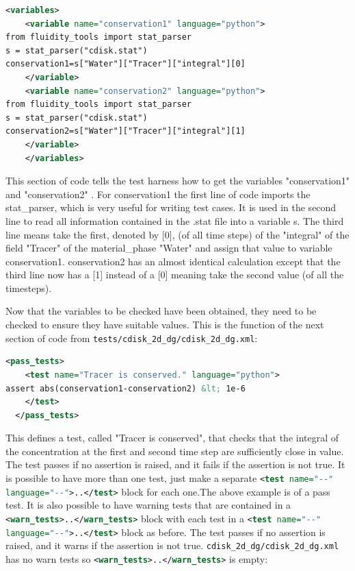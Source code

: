 \begin{example}
\begin{lstlisting}[language=xml] 
  <variables>
    <variable name="conservation1" language="python">
from fluidity_tools import stat_parser
s = stat_parser("cdisk.stat")
conservation1=s["Water"]["Tracer"]["integral"][0]
    </variable>
    <variable name="conservation2" language="python">
from fluidity_tools import stat_parser
s = stat_parser("cdisk.stat")
conservation2=s["Water"]["Tracer"]["integral"][1]
    </variable>
    </variables>
\end{lstlisting}
\end{example}

This section of code tells the test harness how to get the variables "conservation1"  and "conservation2" . For conservation1 the first line of code imports the stat\_parser, which is very useful for writing test cases. It is used in the second line to read all information contained in the .stat file into a variable s. The third line means take the first, denoted by [0], (of all time steps) of the "integral" of the field "Tracer" of the material\_phase "Water" and assign that value to variable conservation1. conservation2 has an almost identical calculation except that the third line now has a [1] instead of a [0] meaning take the second value (of all the timesteps).

Now that the variables to be checked have been obtained, they need to be checked to ensure they have suitable values. This is the function of the next section of code from \lstinline[language=bash]+tests/cdisk_2d_dg/cdisk_2d_dg.xml+:

\begin{example}
\begin{lstlisting}[language=xml] 
    <pass_tests>
    <test name="Tracer is conserved." language="python">
assert abs(conservation1-conservation2) &lt; 1e-6
    </test>
  </pass_tests>
\end{lstlisting}
\end{example}

This defines a test, called "Tracer is conserved", that checks that the integral of the concentration at the first and second time step are sufficiently close in value. The test passes if no assertion is raised, and it fails if the assertion is not true. It is possible to have more than one test, just make a separate \lstinline[language=xml]+<test name="--" language="--">..</test>+ block for each one.The above example is of a pass test. It is also possible to have warning tests that are contained in a \lstinline[language=xml]+<warn_tests>..</warn_tests>+ block with each test in a  \lstinline[language=xml]+<test name="--" language="--">..</test>+ block as before. The test passes if no assertion is raised, and it warns if the assertion is not true. \lstinline[language=bash]+cdisk_2d_dg/cdisk_2d_dg.xml+ has no warn tests so \lstinline[language=xml]+<warn_tests>..</warn_tests>+ is empty:

